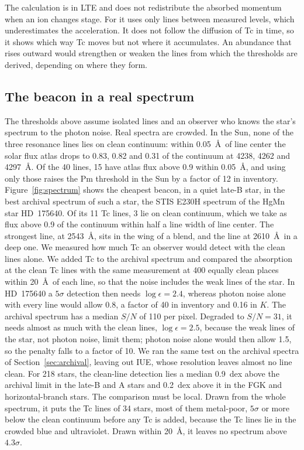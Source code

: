 \documentclass[final,5p]{elsarticle}
\begin{document}
The calculation is in LTE and does not redistribute the absorbed momentum when an ion changes stage. For  it uses only lines between measured levels, which underestimates the acceleration. It does not follow the diffusion of Tc in time, so it shows which way Tc moves but not where it accumulates. An abundance that rises outward would strengthen or weaken the lines from which the thresholds are derived, depending on where they form.

\subsection{The beacon in a real spectrum}
\label{sec:blending}

The thresholds above assume isolated lines and an observer who knows the star's spectrum to the photon noise. Real spectra are crowded. In the Sun, none of the three  resonance lines lies on clean continuum: within 0.05~\AA\ of line center the solar flux atlas \citep{Kurucz2005atlas} drops to 0.83, 0.82 and 0.31 of the continuum at 4238, 4262 and 4297~\AA. Of the 40  lines, 15 have atlas flux above 0.9 within 0.05~\AA, and using only those raises the Pm threshold in the Sun by a factor of 12 in inventory. Figure~\ref{fig:spectrum} shows the cheapest beacon,  in a quiet late-B star, in the best archival spectrum of such a star, the STIS E230H spectrum of the HgMn star HD~175640. Of its 11 Tc lines, 3 lie on clean continuum, which we take as flux above 0.9 of the continuum within half a line width of line center. The strongest line, at 2543~\AA, sits in the wing of a blend, and the line at 2610~\AA\ in a deep one. We measured how much Tc an observer would detect with the clean lines alone. We added Tc to the archival spectrum and compared the absorption at the clean Tc lines with the same measurement at 400 equally clean places within 20~\AA\ of each line, so that the noise includes the weak lines of the star. In HD~175640 a $5\sigma$ detection then needs $\log\epsilon = 2.4$, whereas photon noise alone with every line would allow 0.8, a factor of 40 in inventory and 0.16 in $K$. The archival spectrum has a median $S/N$ of 110 per pixel. Degraded to $S/N = 31$, it needs almost as much with the clean lines, $\log\epsilon = 2.5$, because the weak lines of the star, not photon noise, limit them; photon noise alone would then allow 1.5, so the penalty falls to a factor of 10. We ran the same test on the archival spectra of Section~\ref{sec:archival}, leaving out IUE, whose resolution leaves almost no line clean. For 218 stars, the clean-line detection lies a median 0.9~dex above the archival limit in the late-B and A stars and 0.2~dex above it in the FGK and horizontal-branch stars. The comparison must be local. Drawn from the whole spectrum, it puts the Tc lines of 34 stars, most of them metal-poor, $5\sigma$ or more below the clean continuum before any Tc is added, because the Tc lines lie in the crowded blue and ultraviolet. Drawn within 20~\AA, it leaves no spectrum above $4.3\sigma$.
\end{document}
